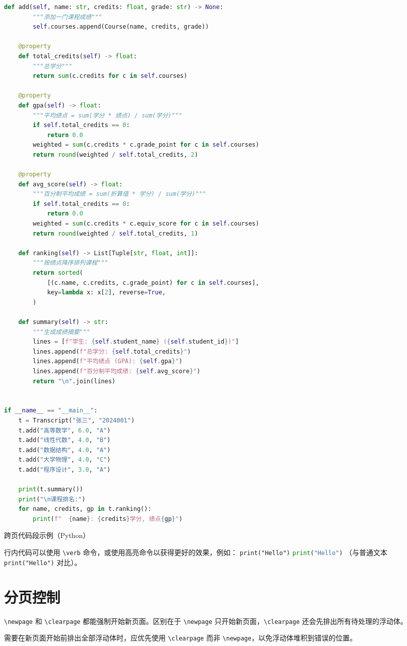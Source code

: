 \begin{longlisting}
\begin{lstlisting}[language=Python]
    def add(self, name: str, credits: float, grade: str) -> None:
        """添加一门课程成绩"""
        self.courses.append(Course(name, credits, grade))

    @property
    def total_credits(self) -> float:
        """总学分"""
        return sum(c.credits for c in self.courses)

    @property
    def gpa(self) -> float:
        """平均绩点 = sum(学分 * 绩点) / sum(学分)"""
        if self.total_credits == 0:
            return 0.0
        weighted = sum(c.credits * c.grade_point for c in self.courses)
        return round(weighted / self.total_credits, 2)

    @property
    def avg_score(self) -> float:
        """百分制平均成绩 = sum(折算值 * 学分) / sum(学分)"""
        if self.total_credits == 0:
            return 0.0
        weighted = sum(c.credits * c.equiv_score for c in self.courses)
        return round(weighted / self.total_credits, 1)

    def ranking(self) -> List[Tuple[str, float, int]]:
        """按绩点降序排列课程"""
        return sorted(
            [(c.name, c.credits, c.grade_point) for c in self.courses],
            key=lambda x: x[2], reverse=True,
        )

    def summary(self) -> str:
        """生成成绩摘要"""
        lines = [f"学生: {self.student_name} ({self.student_id})"]
        lines.append(f"总学分: {self.total_credits}")
        lines.append(f"平均绩点 (GPA): {self.gpa}")
        lines.append(f"百分制平均成绩: {self.avg_score}")
        return "\n".join(lines)


if __name__ == "__main__":
    t = Transcript("张三", "2024001")
    t.add("高等数学", 6.0, "A")
    t.add("线性代数", 4.0, "B")
    t.add("数据结构", 4.0, "A")
    t.add("大学物理", 4.0, "C")
    t.add("程序设计", 3.0, "A")

    print(t.summary())
    print("\n课程排名:")
    for name, credits, gp in t.ranking():
        print(f"  {name}: {credits}学分, 绩点{gp}")
\end{lstlisting}
\fi
\caption{跨页代码段示例（Python）}\label{lst:cross-page}
\end{longlisting}
\makeatother

行内代码可以使用 \verb|\verb| 命令，或使用高亮命令以获得更好的效果，例如：
\makeatletter
\iftongjithesis@minted
  \texttt{print("Hello")}
\else
  \lstinline[language=Python]{print("Hello")}
\fi
\makeatother
（与普通文本 \verb|print("Hello")| 对比）。

\section{分页控制}

\verb|\newpage| 和 \verb|\clearpage| 都能强制开始新页面。区别在于 \verb|\newpage| 只开始新页面，\verb|\clearpage| 还会先排出所有待处理的浮动体。

需要在新页面开始前排出全部浮动体时，应优先使用 \verb|\clearpage| 而非 \verb|\newpage|，以免浮动体堆积到错误的位置。
